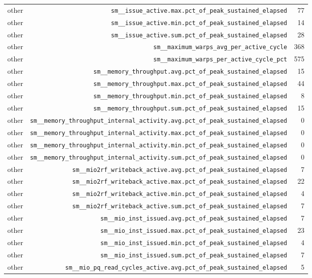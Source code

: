 \begin{table}[h]
\begin{tabular}{|l|r|r|}
other & \texttt{sm__issue_active.max.pct_of_peak_sustained_elapsed} & 77 \\
other & \texttt{sm__issue_active.min.pct_of_peak_sustained_elapsed} & 14 \\
other & \texttt{sm__issue_active.sum.pct_of_peak_sustained_elapsed} & 28 \\
other & \texttt{sm__maximum_warps_avg_per_active_cycle} & 368 \\
other & \texttt{sm__maximum_warps_per_active_cycle_pct} & 575 \\
other & \texttt{sm__memory_throughput.avg.pct_of_peak_sustained_elapsed} & 15 \\
other & \texttt{sm__memory_throughput.max.pct_of_peak_sustained_elapsed} & 44 \\
other & \texttt{sm__memory_throughput.min.pct_of_peak_sustained_elapsed} & 8 \\
other & \texttt{sm__memory_throughput.sum.pct_of_peak_sustained_elapsed} & 15 \\
other & \texttt{sm__memory_throughput_internal_activity.avg.pct_of_peak_sustained_elapsed} & 0 \\
other & \texttt{sm__memory_throughput_internal_activity.max.pct_of_peak_sustained_elapsed} & 0 \\
other & \texttt{sm__memory_throughput_internal_activity.min.pct_of_peak_sustained_elapsed} & 0 \\
other & \texttt{sm__memory_throughput_internal_activity.sum.pct_of_peak_sustained_elapsed} & 0 \\
other & \texttt{sm__mio2rf_writeback_active.avg.pct_of_peak_sustained_elapsed} & 7 \\
other & \texttt{sm__mio2rf_writeback_active.max.pct_of_peak_sustained_elapsed} & 22 \\
other & \texttt{sm__mio2rf_writeback_active.min.pct_of_peak_sustained_elapsed} & 4 \\
other & \texttt{sm__mio2rf_writeback_active.sum.pct_of_peak_sustained_elapsed} & 7 \\
other & \texttt{sm__mio_inst_issued.avg.pct_of_peak_sustained_elapsed} & 7 \\
other & \texttt{sm__mio_inst_issued.max.pct_of_peak_sustained_elapsed} & 23 \\
other & \texttt{sm__mio_inst_issued.min.pct_of_peak_sustained_elapsed} & 4 \\
other & \texttt{sm__mio_inst_issued.sum.pct_of_peak_sustained_elapsed} & 7 \\
other & \texttt{sm__mio_pq_read_cycles_active.avg.pct_of_peak_sustained_elapsed} & 5 \\

\end{tabular}
\end{table}
